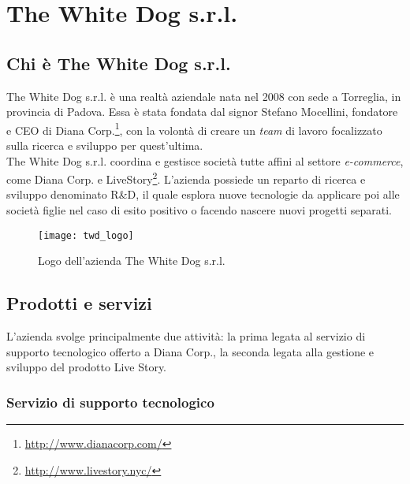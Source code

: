 \newpage
\chapter{The White Dog s.r.l.}
\label{cap:thewhitedog}

\section{Chi è The White Dog s.r.l.}

The White Dog s.r.l. è una realtà aziendale nata nel 2008 con sede a Torreglia, in provincia di Padova. Essa è stata fondata dal signor Stefano Mocellini, fondatore e CEO di Diana Corp.\footnote[1]{\url{http://www.dianacorp.com/}}, con la volontà di creare un \textit{team} di lavoro focalizzato sulla ricerca e sviluppo per quest'ultima. \\
The White Dog s.r.l. coordina e gestisce società tutte affini al settore \textit{e-commerce}, come Diana Corp. e LiveStory\footnote[2]{\url{http://www.livestory.nyc/}}. L'azienda possiede un reparto di ricerca e sviluppo denominato R\&D, il quale esplora nuove tecnologie da applicare poi alle società figlie nel caso di esito positivo o facendo nascere nuovi progetti separati.

\label{The White Dog s.r.l.}
\begin{figure}[ht]
	\begin{center}
		\texttt{[image: twd\_logo]}
		\caption{Logo dell'azienda The White Dog s.r.l.}
	\end{center}
\end{figure}
\FloatBarrier

\section{Prodotti e servizi}

L'azienda svolge principalmente due attività: la prima legata al servizio di supporto tecnologico offerto a Diana Corp., la seconda legata alla gestione e sviluppo del prodotto Live Story.

\subsection{Servizio di supporto tecnologico}

